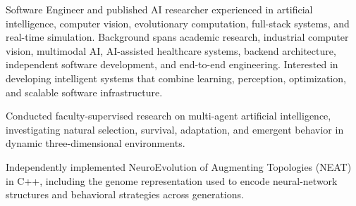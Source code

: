 \documentclass{../../../Styles/MS-Style}
\begin{document}
\begin{center}

\end{center}

\begin{Form}

	\normalsize{
		Software Engineer and published AI researcher experienced in artificial intelligence,
		computer vision, evolutionary computation, full-stack systems, and real-time simulation.
		Background spans academic research, industrial computer vision, multimodal AI,
		AI-assisted healthcare systems, backend architecture, independent software development,
		and end-to-end engineering. Interested in developing intelligent systems that combine
		learning, perception, optimization, and scalable software infrastructure.
	}









	\begin{listBlock}

		\generalItem
		Conducted faculty-supervised research on multi-agent artificial intelligence,
		investigating natural selection, survival, adaptation, and emergent behavior
		in dynamic three-dimensional environments.\cite{TagResearchRecommendation}

		\generalItem
		Independently implemented NeuroEvolution of Augmenting Topologies (NEAT) in C++,
		including the genome representation used to encode neural-network structures
		and behavioral strategies across generations.


\end{listBlock}
\end{Form}
\end{document}
